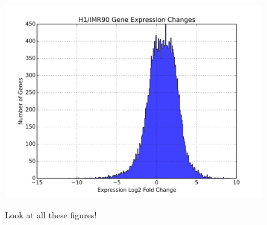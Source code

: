 \begin{figure}
  \includegraphics[width=\textwidth]{./figures/supplementary/expressionDelta.png}\label{fig:i90h1expression}
  \caption{Look at all these figures!}
\end{figure}

